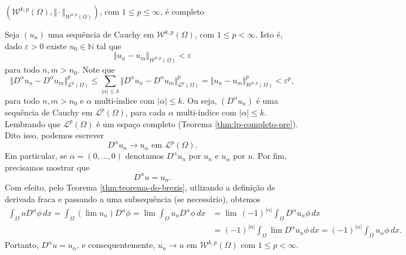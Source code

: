\documentclass[a4paper, 11pt]{book}
\theoremstyle{definition}
\newcommand{\bN}{\mathbb{N}}
\newcommand{\cL}{\mathcal{L}}
\newcommand{\cW}{\mathcal{W}}
\begin{document}
\begin{tbox} \label{thm:sobolev-completo}
    $(\cW^{k,p}(\Omega), \Vert \cdot \Vert_{\cW^{k,p}(\Omega)})$, com $1 \leqslant p \leqslant \infty$, é completo
\end{tbox}
\begin{prf}
    Seja $(u_n)$ uma sequência de Cauchy em $\cW^{k,p}(\Omega)$, com $1 \leqslant p < \infty$. Isto é, dado $\varepsilon > 0$ existe $n_0 \in \bN$ tal que
    \[
        \Vert u_n - u_m \Vert_{\cW^{k,p}(\Omega)} < \varepsilon
    \]
    para todo $n,m > n_0$.
    Note que
    \[
        \Vert D^\alpha u_n - D^\alpha u_m \Vert_{\cL^p(\Omega)}^p \leqslant \sum_{|\alpha| \leqslant k} \Vert D^\alpha u_n - D^\alpha u_m \Vert_{\cL^p(\Omega)}^p = \Vert u_n - u_m \Vert_{\cW^{k,p}(\Omega)}^p < \varepsilon^p,
    \]
    para todo $n,m > n_0$ e $\alpha$ multi-índice com $|\alpha| \leqslant k$. Ou seja, $(D^\alpha u_n)$ é uma sequência de Cauchy em $\cL^p(\Omega)$, para cada $\alpha$ multi-índice com $|\alpha| \leqslant k$. Lembrando que $\cL^p(\Omega)$ é um espaço completo (Teorema \ref{thm:lp-completo-pre}).
    Dito isso, podemos escrever
    \[
        D^\alpha u_n \to u_\alpha \text{ em } \cL^p(\Omega).
    \]
    Em particular, se $\alpha = (0,\dots,0)$ denotamos $D^\alpha u_n$ por $u_n$ e $u_\alpha$ por $u$.
    Por fim, precisamos mostrar que
    \[
        D^\alpha u = u_\alpha.
    \]
Com efeito, pelo Teorema \ref{thm:teorema-do-brezis}, utlizando a definição de derivada fraca e passando a uma subsequência (se necessário), obtemos
    \[
        \begin{aligned}
            \int_\Omega u D^\alpha \phi \, dx 
            = \int_\Omega (\lim u_n) D^\alpha \phi 
            = \lim\! \int_\Omega u_n D^\alpha \phi \,dx
            &= \lim\, (-1)^{|\alpha|}\!\int_\Omega  D^\alpha u_n \phi\,dx \\
            &= (-1)^{|\alpha|}\!\int_\Omega \lim D^\alpha u_n \phi \,dx 
            = (-1)^{|\alpha|}\!\int_\Omega u_\alpha \phi \,dx.
        \end{aligned}
    \]
    Portanto, $D^\alpha u = u_\alpha$, e consequentemente, $u_n \to u$ em $\cW^{k,p}(\Omega)$ com $1 \leqslant p < \infty$.


\end{prf}
\end{document}
